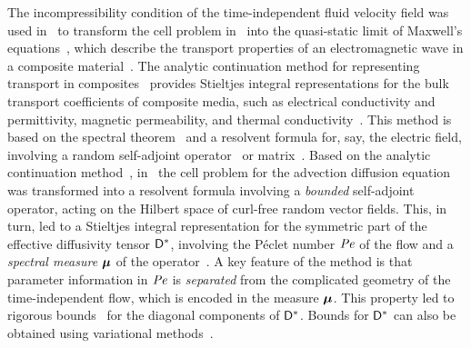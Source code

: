 \documentclass[amsa]{ipart}
\begin{document}
The incompressibility condition of the time-independent fluid velocity
field was used in~\cite{Avellaneda:PRL-753,Avellaneda:CMP-339} to
transform the cell problem in~\cite{McLaughlin:SIAM_JAM:780} into the
quasi-static limit of Maxwell's
equations~\cite{Jackson-1999,Golden:CMP-473}, which describe the
transport properties of an electromagnetic wave in a composite
material~\cite{Milton:2002:TC}. The analytic continuation method for
representing transport in composites~\cite{Golden:CMP-473} provides
Stieltjes integral representations for the bulk transport coefficients
of composite media, such as electrical conductivity and permittivity,
magnetic permeability, and thermal
conductivity~\cite{Milton:2002:TC}. This method is based on the
spectral theorem~\cite{Stone:64,Reed-1980} and a resolvent formula
for, say, the electric field, involving a random self-adjoint
operator~\cite{Golden:CMP-473,Murphy:JMP:063506} or
matrix~\cite{Murphy:2015:CMS:13:4:825}. Based on the analytic
continuation method~\cite{Golden:CMP-473},
in~\cite{Avellaneda:PRL-753,Avellaneda:CMP-339} 
the cell problem for the advection diffusion equation was transformed
into a resolvent formula involving a 
\emph{bounded} self-adjoint operator, acting on the Hilbert
space of curl-free random vector
fields. This, in turn,     
led to a Stieltjes integral representation for the symmetric part of
the effective diffusivity tensor $\mathsf{D}^*$, involving the P{\'e}clet
number $\mbox{\textit{Pe}}$ of the flow and a \emph{spectral measure} $\mbox{\boldmath${\mu}$}$ of the
operator~\cite{Avellaneda:PRL-753,Avellaneda:CMP-339}. A key feature
of the method is that parameter information in $\mbox{\textit{Pe}}$ is 
\emph{separated} from the complicated geometry of the time-independent
flow, which is encoded in the measure $\mbox{\boldmath${\mu}$}$. This property led to
rigorous bounds~\cite{Avellaneda:CMP-339} for the diagonal components
of $\mathsf{D}^*$. Bounds for $\mathsf{D}^*$ can also be obtained using variational 
methods~\cite{Avellaneda:CMP-339,Fannjiang:1994:SIAM_JAM:333,Novikov:2005:CPAM:867,Fannjiang:1997:1033}.  
\end{document}
